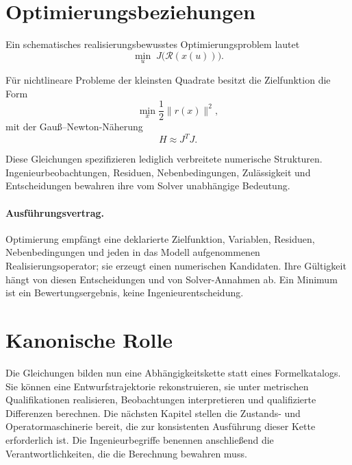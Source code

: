 \section{Optimierungsbeziehungen}

Ein schematisches realisierungsbewusstes Optimierungsproblem lautet
\begin{equation}
\min_u\;J\bigl(\mathcal R(x(u))\bigr).
\label{eq:general-optimization}
\end{equation}

Für nichtlineare Probleme der kleinsten Quadrate besitzt die Zielfunktion die
Form
\begin{equation}
\min_x\frac12\|r(x)\|^2,
\label{eq:least-squares}
\end{equation}
mit der Gauß--Newton-Näherung
\begin{equation}
H\approx J^T J.
\label{eq:gauss-newton}
\end{equation}

Diese Gleichungen spezifizieren lediglich verbreitete numerische Strukturen.
Ingenieurbeobachtungen, Residuen, Nebenbedingungen, Zulässigkeit und
Entscheidungen bewahren ihre vom Solver unabhängige Bedeutung.

\paragraph{Ausführungsvertrag.}
Optimierung empfängt eine deklarierte Zielfunktion, Variablen, Residuen,
Nebenbedingungen und jeden in das Modell aufgenommenen Realisierungsoperator;
sie erzeugt einen numerischen Kandidaten. Ihre Gültigkeit hängt von diesen
Entscheidungen und von Solver-Annahmen ab. Ein Minimum ist ein
Bewertungsergebnis, keine Ingenieurentscheidung.

\section{Kanonische Rolle}

Die Gleichungen bilden nun eine Abhängigkeitskette statt eines Formelkatalogs.
Sie können eine Entwurfstrajektorie rekonstruieren, sie unter metrischen
Qualifikationen realisieren, Beobachtungen interpretieren und qualifizierte
Differenzen berechnen. Die nächsten Kapitel stellen die Zustands- und
Operatormaschinerie bereit, die zur konsistenten Ausführung dieser Kette
erforderlich ist. Die Ingenieurbegriffe benennen anschließend die
Verantwortlichkeiten, die die Berechnung bewahren muss.
